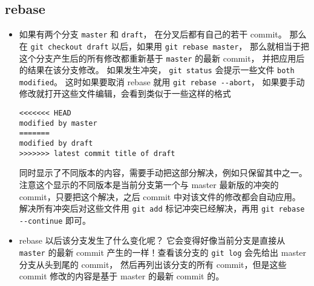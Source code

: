 \subsection{rebase}
\begin{itemize}
\item 如果有两个分支 \verb`master` 和 \verb`draft`， 在分叉后都有自己的若干 commit。 那么在 \verb`git checkout draft` 以后，如果用 \verb`git rebase master`， 那么就相当于把这个分支产生后的所有修改都重新基于 \verb`master` 的最新 commit， 并把应用后的结果在该分支修改。 如果发生冲突， \verb`git status` 会提示一些文件 \verb`both modified`。 这时如果要取消 rebase 就用 \verb`git rebase --abort`， 如果要手动修改就打开这些文件编辑，会看到类似于一些这样的格式
\begin{lstlisting}[language=none]
<<<<<<< HEAD
modified by master
=======
modified by draft
>>>>>>> latest commit title of draft
\end{lstlisting}
同时显示了不同版本的内容，需要手动把这部分解决，例如只保留其中之一。 注意这个显示的不同版本是当前分支第一个与 master 最新版的冲突的 commit，只要把这个解决，之后 commit 中对该文件的修改都会自动应用。 解决所有冲突后对这些文件用 \verb`git add` 标记冲突已经解决，再用 \verb`git rebase --continue` 即可。
\item rebase 以后该分支发生了什么变化呢？ 它会变得好像当前分支是直接从 \verb`master` 的最新 commit 产生的一样！查看该分支的 \verb`git log` 会先给出 master 分支从头到尾的 commit， 然后再列出该分支的所有 commit，但是这些 commit 修改的内容是基于 master 的最新 commit 的。
\end{itemize}
